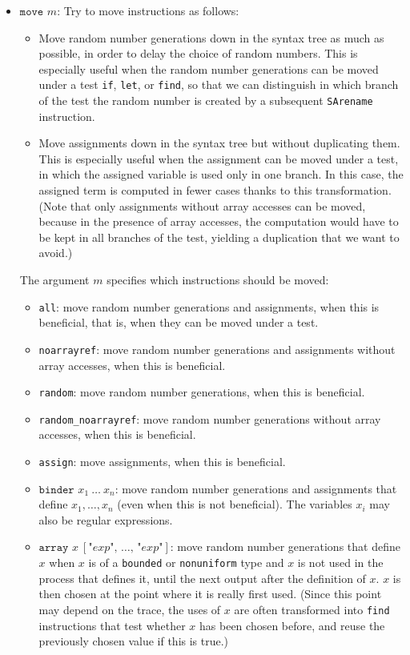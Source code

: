 \documentclass{article}
\begin{document}
\begin{itemize}
\item $\texttt{move }m$: Try to move instructions as follows:
\begin{itemize}

\item Move random number generations down in the syntax tree as much
  as possible, in order to delay the choice of random numbers. This is
  especially useful when the random number generations can be moved
  under a test {\tt if}, {\tt let}, or {\tt find}, so that we can
  distinguish in which branch of the test the random number is created
  by a subsequent \texttt{SArename} instruction.

\item Move assignments down in the syntax tree but without duplicating
  them. This is especially useful when the assignment can be moved
  under a test, in which the assigned variable is used only in one
  branch. In this case, the assigned term is computed in fewer cases
  thanks to this transformation.
  (Note that only assignments without array accesses can be moved,
  because in the presence of array accesses, the computation would have
  to be kept in all branches of the test, yielding a duplication that 
  we want to avoid.)

\end{itemize}
The argument $m$ specifies which instructions should be moved:
\begin{itemize}
\item \texttt{all}: move random number generations and assignments,
when this is beneficial, that is, when they can be moved under a test.
\item \texttt{noarrayref}: move random number generations and assignments
without array accesses, when this is beneficial.
\item \texttt{random}: move random number generations, when this is beneficial.
\item \texttt{random\string_noarrayref}: move random number generations 
without array accesses, when this is beneficial.
\item \texttt{assign}: move assignments, when this is beneficial.
\item $\texttt{binder }x_1\ \dots\ x_n$: move random number generations and assignments
that define $x_1, \ldots, x_n$ (even when this is not beneficial).
The variables $x_i$ may also be regular expressions.
\item $\texttt{array }x\ [\texttt{"}exp\texttt{", }\dots\texttt{, "}exp\texttt{"}]$: 
move random number generations that define $x$
when $x$ is of a {\tt bounded} or {\tt nonuniform} type and $x$ is not used in
the process that defines it, until the next output after the definition of $x$.
$x$ is then chosen at the point where it is really first used. 
(Since this point may depend on the trace, the uses of $x$ are often
transformed into {\tt find} instructions that test whether $x$ has been 
chosen before, and reuse the previously chosen value if this is true.)


\end{itemize}
\end{itemize}
\end{document}
